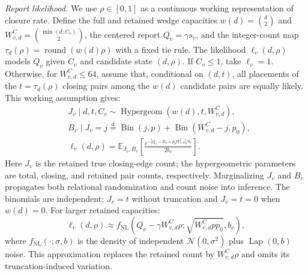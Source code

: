 \emph{Report likelihood.} We use $\rho\in[0,1]$ as a continuous working representation of closure rate. Define the full and retained wedge capacities $w(d)=\binom d2$ and $W^C_{v,d}=\binom{\min(d,C_v)}2$, the centered report $Q_v=\gamma s_v$, and the integer-count map $\tau_d(\rho)=\operatorname{round}(w(d)\rho)$ with a fixed tie rule. The likelihood $\ell_v(d,\rho)$ models $Q_v$ given $C_v$ and candidate state $(d,\rho)$. If $C_v\le1$, take $\ell_v=1$. Otherwise, for $W^C_{v,d}\le64$, assume that, conditional on $(d,t)$, all placements of the $t=\tau_d(\rho)$ closing pairs among the $w(d)$ candidate pairs are equally likely. This working assumption gives:
\begin{equation}
\begin{aligned}
&J_v\mid d,t,C_v\sim\operatorname{Hypergeom}(w(d),t,W^C_{v,d}),\\
&B_v\mid J_v=j\overset{\mathrm d}{=}
\operatorname{Bin}(j,p)+\operatorname{Bin}(W^C_{v,d}-j,p_0),\\
&\ell_v(d,\rho)=\mathbb E_{J_v,B_v}\!\left[
\frac{e^{-|Q_v-B_v+p_0W^C_{v,d}|/b_v}}{2b_v}\right].
\end{aligned}
\label{eq:projected_closing_count}
\end{equation}
Here $J_v$ is the retained true closing-edge count; 
the hypergeometric parameters are total, closing, and retained pair counts, respectively. 
Marginalizing $J_v$ and $B_v$ propagates both relational randomization and count noise into inference. 
The binomials are independent; $J_v=t$ without truncation and $J_v=t=0$ when $w(d)=0$. 
For larger retained capacities:
\begin{equation}
\ell_v(d,\rho)\approx
f_{\mathrm{NL}}\!\left(Q_v-\gamma W^C_{v,d}\rho;
\sqrt{W^C_{v,d}pp_0},b_v\right),
\label{eq:closure_likelihood}
\end{equation}
where $f_{\mathrm{NL}}(\cdot;\sigma,b)$ is the density of independent $\mathcal N(0,\sigma^2)$ plus $\operatorname{Lap}(0,b)$ noise. This approximation replaces the retained count by $W^C_{v,d}\rho$ and omits its truncation-induced variation.

